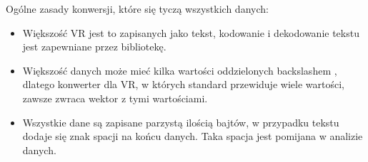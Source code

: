 \par
Ogólne zasady konwersji, które się tyczą wszystkich danych:
\begin{itemize}
    \item Większość VR jest to zapisanych jako tekst, kodowanie i dekodowanie tekstu jest zapewniane przez bibliotekę.
    \item Większość danych może mieć kilka wartości oddzielonych backslashem \quotett{\textbackslash}, dlatego konwerter dla VR, w których standard przewiduje wiele wartości, zawsze zwraca wektor z tymi wartościami.
    \item Wszystkie dane są zapisane parzystą ilością bajtów, w przypadku tekstu dodaje się znak spacji na końcu danych.
          Taka spacja jest pomijana w analizie danych.
\end{itemize}

